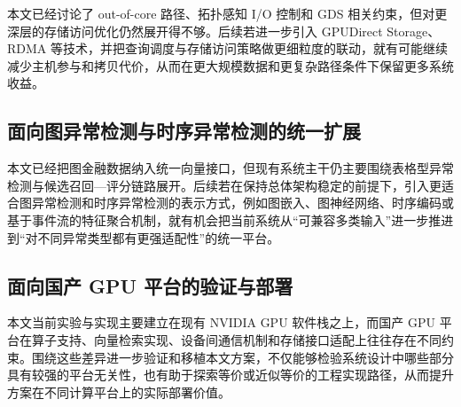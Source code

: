 本文已经讨论了 out-of-core 路径、拓扑感知 I/O 控制和 GDS 相关约束，但对更深层的存储访问优化仍然展开得不够。后续若进一步引入 GPUDirect Storage、RDMA 等技术，并把查询调度与存储访问策略做更细粒度的联动，就有可能继续减少主机参与和拷贝代价，从而在更大规模数据和更复杂路径条件下保留更多系统收益。

\subsection{面向图异常检测与时序异常检测的统一扩展}

本文已经把图金融数据纳入统一向量接口，但现有系统主干仍主要围绕表格型异常检测与候选召回---评分链路展开。后续若在保持总体架构稳定的前提下，引入更适合图异常检测和时序异常检测的表示方式，例如图嵌入、图神经网络、时序编码或基于事件流的特征聚合机制，就有机会把当前系统从“可兼容多类输入”进一步推进到“对不同异常类型都有更强适配性”的统一平台。

\subsection{面向国产 GPU 平台的验证与部署}

本文当前实验与实现主要建立在现有 NVIDIA GPU 软件栈之上，而国产 GPU 平台在算子支持、向量检索实现、设备间通信机制和存储接口适配上往往存在不同约束。围绕这些差异进一步验证和移植本文方案，不仅能够检验系统设计中哪些部分具有较强的平台无关性，也有助于探索等价或近似等价的工程实现路径，从而提升方案在不同计算平台上的实际部署价值。

